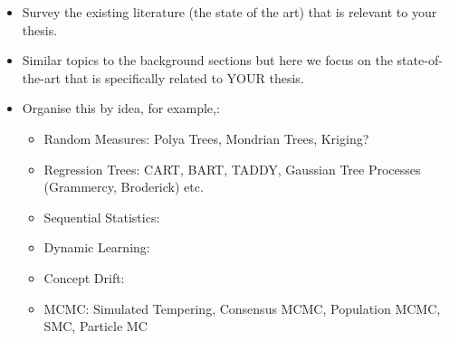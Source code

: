 \begin{itemize}
\item Survey the existing literature (the state of the art) that is relevant to your thesis.
\item Similar topics to the background sections but here we focus on the state-of-the-art that is specifically related to YOUR thesis.
\item Organise this by idea, for example,:
\begin{itemize}
\item Random Measures: Polya Trees, Mondrian Trees, Kriging?
\item Regression Trees: CART, BART, TADDY, Gaussian Tree Processes (Grammercy, Broderick) etc.
\item Sequential Statistics:
\item Dynamic Learning:
\item Concept Drift:
\item MCMC: Simulated Tempering, Consensus MCMC, Population MCMC, SMC, Particle MC
\end{itemize}
\end{itemize}


